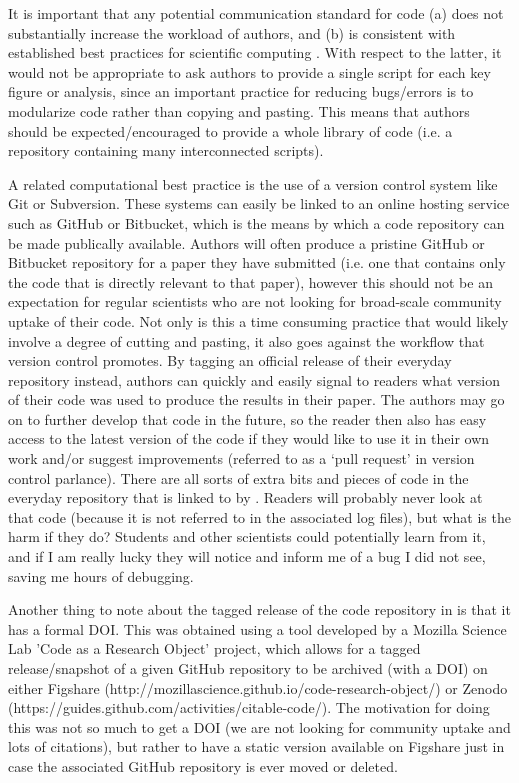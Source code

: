 It is important that any potential communication standard for code (a) does not substantially increase the workload of authors, and (b) is consistent with established best practices for scientific computing \citep{Wilson2014a}. With respect to the latter, it would not be appropriate to ask authors to provide a single script for each key figure or analysis, since an important practice for reducing bugs/errors is to modularize code rather than copying and pasting. This means that authors should be expected/encouraged to provide a whole library of code (i.e. a repository containing many interconnected scripts).

A related computational best practice is the use of a version control system like Git or Subversion. These systems can easily be linked to an online hosting service such as GitHub or Bitbucket, which is the means by which a code repository can be made publically available. Authors will often produce a pristine GitHub or Bitbucket repository for a paper they have submitted (i.e. one that contains only the code that is directly relevant to that paper), however this should not be an expectation for regular scientists who are not looking for broad-scale community uptake of their code. Not only is this a time consuming practice that would likely involve a degree of cutting and pasting, it also goes against the workflow that version control promotes. By tagging an official release of their everyday repository instead, authors can quickly and easily signal to readers what version of their code was used to produce the results in their paper. The authors may go on to further develop that code in the future, so the reader then also has easy access to the latest version of the code if they would like to use it in their own work and/or suggest improvements (referred to as a `pull request' in version control parlance). There are all sorts of extra bits and pieces of code in the everyday repository that is linked to by \citet{Irving2015}. Readers will probably never look at that code (because it is not referred to in the associated log files), but what is the harm if they do? Students and other scientists could potentially learn from it, and if I am really lucky they will notice and inform me of a bug I did not see, saving me hours of debugging.       

Another thing to note about the tagged release of the code repository in \citet{Irving2015} is that it has a formal DOI. This was obtained using a tool developed by a Mozilla Science Lab 'Code as a Research Object' project, which allows for a tagged release/snapshot of a given GitHub repository to be archived (with a DOI) on either Figshare (http://mozillascience.github.io/code-research-object/) or Zenodo (https://guides.github.com/activities/citable-code/). The motivation for doing this was not so much to get a DOI (we are not looking for community uptake and lots of citations), but rather to have a static version available on Figshare just in case the associated GitHub repository is ever moved or deleted.  

